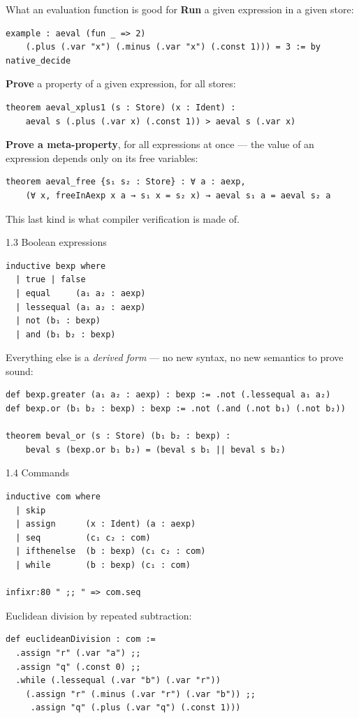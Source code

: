\documentclass[aspectratio=169,10pt]{beamer}
\begin{document}
\begin{frame}[fragile]{What an evaluation function is good for}
\textbf{Run} a given expression in a given store:
\begin{lstlisting}
example : aeval (fun _ => 2)
    (.plus (.var "x") (.minus (.var "x") (.const 1))) = 3 := by native_decide
\end{lstlisting}

\textbf{Prove} a property of a given expression, for all stores:
\begin{lstlisting}
theorem aeval_xplus1 (s : Store) (x : Ident) :
    aeval s (.plus (.var x) (.const 1)) > aeval s (.var x)
\end{lstlisting}

\textbf{Prove a meta-property}, for all expressions at once --- the value of an
expression depends only on its free variables:
\begin{lstlisting}
theorem aeval_free {s₁ s₂ : Store} : ∀ a : aexp,
    (∀ x, freeInAexp x a → s₁ x = s₂ x) → aeval s₁ a = aeval s₂ a
\end{lstlisting}
This last kind is what compiler verification is made of.
\end{frame}

\begin{frame}[fragile]{1.3 Boolean expressions}
\begin{lstlisting}
inductive bexp where
  | true | false
  | equal     (a₁ a₂ : aexp)
  | lessequal (a₁ a₂ : aexp)
  | not (b₁ : bexp)
  | and (b₁ b₂ : bexp)
\end{lstlisting}

Everything else is a \emph{derived form} --- no new syntax, no new semantics
to prove sound:
\begin{lstlisting}
def bexp.greater (a₁ a₂ : aexp) : bexp := .not (.lessequal a₁ a₂)
def bexp.or (b₁ b₂ : bexp) : bexp := .not (.and (.not b₁) (.not b₂))

theorem beval_or (s : Store) (b₁ b₂ : bexp) :
    beval s (bexp.or b₁ b₂) = (beval s b₁ || beval s b₂)
\end{lstlisting}
\end{frame}

\begin{frame}[fragile]{1.4 Commands}
\begin{lstlisting}
inductive com where
  | skip
  | assign      (x : Ident) (a : aexp)
  | seq         (c₁ c₂ : com)
  | ifthenelse  (b : bexp) (c₁ c₂ : com)
  | while       (b : bexp) (c₁ : com)

infixr:80 " ;; " => com.seq
\end{lstlisting}

Euclidean division by repeated subtraction:
\begin{lstlisting}
def euclideanDivision : com :=
  .assign "r" (.var "a") ;;
  .assign "q" (.const 0) ;;
  .while (.lessequal (.var "b") (.var "r"))
    (.assign "r" (.minus (.var "r") (.var "b")) ;;
     .assign "q" (.plus (.var "q") (.const 1)))
\end{lstlisting}
\end{frame}
\end{document}
